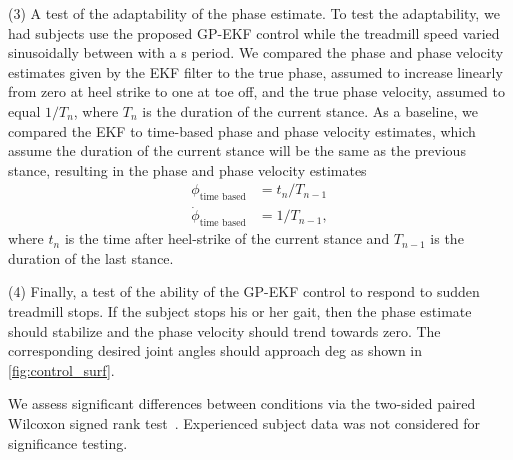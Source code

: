 (3) A test of the adaptability of the phase estimate.  To test the adaptability,
we had subjects use the proposed GP-EKF control while the treadmill speed varied
sinusoidally between  with a \unit[20]{s} period. We
compared the phase and phase velocity estimates given by the EKF filter to the
true phase, assumed to increase linearly from zero at heel strike to one at toe
off, and the true phase velocity, assumed to equal $1/T_n$, where $T_n$ is the
duration of the current stance. As a baseline, we compared the EKF to time-based
phase and phase velocity estimates, which assume the duration of the current
stance will be the same as the previous stance, resulting in the phase and phase
velocity estimates
\begin{align}
    \phi_\textrm{time based} &= t_n/T_{n-1} \\
    \dot{\phi}_\textrm{time based} &= 1/T_{n-1}, \label{eq:init_cond_time}
\end{align}
where $t_n$ is the time after heel-strike of the current stance and $T_{n-1}$ is
the duration of the last stance. 

(4) Finally, a test of the ability of the GP-EKF control to respond to sudden
treadmill stops. If the subject stops his or her gait, then the phase estimate
should stabilize and the phase velocity should trend towards zero. The
corresponding desired joint angles should approach \unit[5]{deg} as shown in
\cref{fig:control_surf}. 

We assess significant differences between conditions via the two-sided paired
Wilcoxon signed rank test~\citep{gibbons2011nonparametric}. Experienced subject
data was not considered for significance testing.
